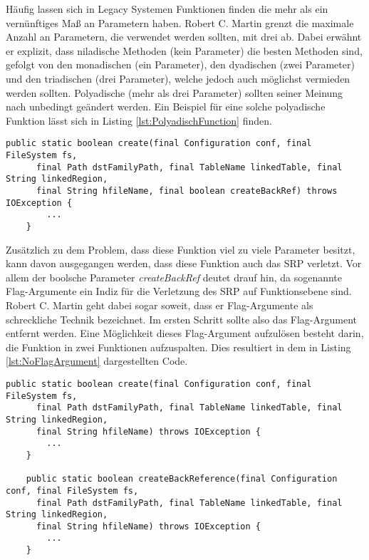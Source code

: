 \SuperPar Häufig lassen sich in Legacy Systemen Funktionen finden die mehr als ein vernünftiges Maß an Parametern haben. Robert C. Martin grenzt die maximale Anzahl an Parametern, die verwendet werden sollten, mit drei ab. Dabei erwähnt er explizit, dass niladische Methoden (kein Parameter) die besten Methoden sind, gefolgt von den monadischen (ein Parameter), den dyadischen (zwei Parameter) und den triadischen (drei Parameter), welche jedoch auch möglichst vermieden werden sollten. Polyadische (mehr als drei Parameter) sollten seiner Meinung nach unbedingt geändert werden. Ein Beispiel für eine solche polyadische Funktion lässt sich in Listing
 \ref{lst:PolyadischFunction} finden.

\begin{lstlisting}[language={[Sharp]C}, caption=Beispiel für eine Polyadische Funktion, label=lst:PolyadischFunction]
  public static boolean create(final Configuration conf, final FileSystem fs,
      final Path dstFamilyPath, final TableName linkedTable, final String linkedRegion,
      final String hfileName, final boolean createBackRef) throws IOException {
		...
	}
\end{lstlisting}

\SuperPar Zusätzlich zu dem Problem, dass diese Funktion viel zu viele Parameter besitzt, kann davon ausgegangen werden, dass diese Funktion auch das SRP verletzt. Vor allem der boolsche Parameter \textit{createBackRef} deutet drauf hin, da sogenannte Flag-Argumente ein Indiz für die Verletzung des SRP auf Funktionsebene sind. Robert C. Martin geht dabei sogar soweit, dass er Flag-Argumente als schreckliche Technik bezeichnet. Im ersten Schritt sollte also das Flag-Argument entfernt werden. Eine Möglichkeit dieses Flag-Argument aufzulösen besteht darin, die Funktion in zwei Funktionen aufzuspalten. Dies resultiert in dem in Listing  \ref{lst:NoFlagArgument} dargestellten Code.

\begin{lstlisting}[language={[Sharp]C}, caption=Beispiel für Eliminierung eines Flag Arguments, label=lst:NoFlagArgument]
   public static boolean create(final Configuration conf, final FileSystem fs,
      final Path dstFamilyPath, final TableName linkedTable, final String linkedRegion,
      final String hfileName) throws IOException {
		...
	}
	
	public static boolean createBackReference(final Configuration conf, final FileSystem fs,
      final Path dstFamilyPath, final TableName linkedTable, final String linkedRegion,
      final String hfileName) throws IOException {
		...
	}
\end{lstlisting}

